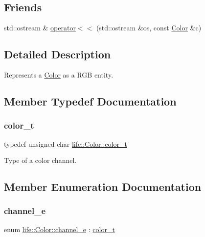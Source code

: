 \subsection*{Friends}
\begin{DoxyCompactItemize}
\item 
std\+::ostream \& \mbox{\hyperlink{structlife_1_1_color_afdfe1a75bd9930a51707d642a7a4afcd}{operator$<$$<$}} (std\+::ostream \&os, const \mbox{\hyperlink{structlife_1_1_color}{Color}} \&c)
\end{DoxyCompactItemize}


\subsection{Detailed Description}
Represents a \mbox{\hyperlink{structlife_1_1_color}{Color}} as a R\+GB entity. 

\subsection{Member Typedef Documentation}
\mbox{\label{structlife_1_1_color_ab392ce7ebd8204f1447c7e296dde9a17}} 
\subsubsection{\texorpdfstring{color\_t}{color\_t}}
{\footnotesize\ttfamily typedef unsigned char \mbox{\hyperlink{structlife_1_1_color_ab392ce7ebd8204f1447c7e296dde9a17}{life\+::\+Color\+::color\+\_\+t}}}

Type of a color channel. 

\subsection{Member Enumeration Documentation}
\mbox{\label{structlife_1_1_color_a56dfdd352118c14f349c4372fd88b251}} 
\subsubsection{\texorpdfstring{channel\_e}{channel\_e}}
{\footnotesize\ttfamily enum \mbox{\hyperlink{structlife_1_1_color_a56dfdd352118c14f349c4372fd88b251}{life\+::\+Color\+::channel\+\_\+e}} \+: \mbox{\hyperlink{structlife_1_1_color_ab392ce7ebd8204f1447c7e296dde9a17}{color\+\_\+t}}}



